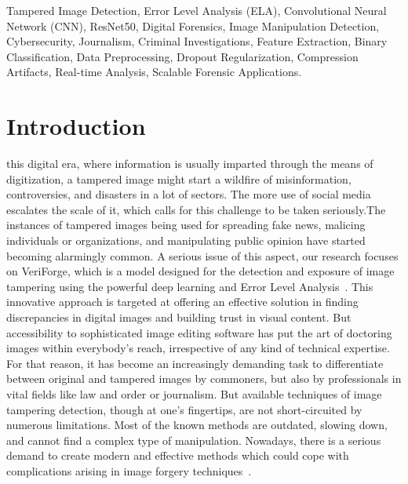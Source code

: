 \documentclass{ieeeaccess}
\begin{document}
\begin{keywords}
	Tampered Image Detection, Error Level Analysis (ELA), Convolutional Neural Network (CNN), ResNet50, Digital Forensics, Image Manipulation Detection, Cybersecurity, Journalism, Criminal Investigations, Feature Extraction, Binary Classification, Data Preprocessing, Dropout Regularization, Compression Artifacts, Real-time Analysis, Scalable Forensic Applications.
\end{keywords}

\titlepgskip=-21pt

\maketitle

\section{Introduction}
\label{sec:introduction}
 this digital era, where information is usually imparted through the means of digitization, a tampered image might start a wildfire of misinformation, controversies, and disasters in a lot of sectors. The more use of social media escalates the scale of it, which calls for this challenge to be taken seriously.The instances of tampered images being used for spreading fake news, malicing individuals or organizations, and manipulating public opinion have started becoming alarmingly common. A serious issue of this aspect, our research focuses on VeriForge, which is a model designed for the detection and exposure of image tampering using the powerful deep learning and Error Level Analysis~\cite{gupta2022detection}. This innovative approach is targeted at offering an effective solution in finding discrepancies in digital images and building trust in visual content. But accessibility to sophisticated image editing software has put the art of doctoring images within everybody's reach, irrespective of any kind of technical expertise. For that reason, it has become an increasingly demanding task to differentiate between original and tampered images by commoners, but also by professionals in vital fields like law and order or journalism. But available techniques of image tampering detection, though at one's fingertips, are not short-circuited by numerous limitations. Most of the known methods are outdated, slowing down, and cannot find a complex type of manipulation. Nowadays, there is a serious demand to create modern and effective methods which could cope with complications arising in image forgery techniques~\cite{kaur2019weak}.
\end{document}
